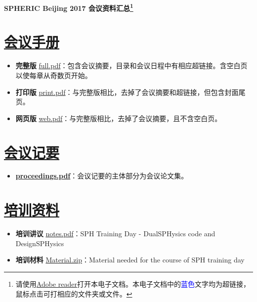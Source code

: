\documentclass[a4,11pt]{article}
\begin{document}
\pagestyle{fancy}
\headheight 20pt

\begin{center}
{\LARGE\bf SPHERIC Beijing 2017 会议资料汇总\footnote{请使用\href{http://get.adobe.com/reader}{Adobe reader}打开本电子文档。本电子文档中的\textcolor{blue}{蓝色}文字均为超链接，鼠标点击可打相应的文件夹或文件。}}\\
\vspace{1.5em}
\end{center}



\section{\href{run:materials/handbook/}{会议手册}}
\begin{itemize}
\item \textbf{完整版} \hspace{0.7em}\href{materials/handbook/full.pdf}{full.pdf}：包含会议摘要，目录和会议日程中有相应超链接。含空白页以使每章从奇数页开始。
\item \textbf{打印版} \href{materials/handbook/print.pdf}{print.pdf}：与完整版相比，去掉了会议摘要和超链接，但包含封面尾页。
\item \textbf{网页版} \hspace{0.5em}\href{materials/handbook/web.pdf}{web.pdf}：与完整版相比，去掉了会议摘要，且不含空白页。
\end{itemize}


\section{\href{run:materials/proceedings/}{会议记要}}
\begin{itemize}
\item \href{materials/proceedings/proceedings.pdf}{\bf proceedings.pdf}：会议记要的主体部分为会议论文集。
\end{itemize}

\section{\href{run:materials/training/}{培训资料}}
\begin{itemize}
\item \textbf{培训讲议} \href{materials/training/notes.pdf}{notes.pdf}：SPH Training Day - DualSPHysics code and DesignSPHysics
\item \textbf{培训材料} \href{run:materials/training/Material.zip}{Material.zip}：Material needed for the course of SPH training day
\end{itemize}
\end{document}
